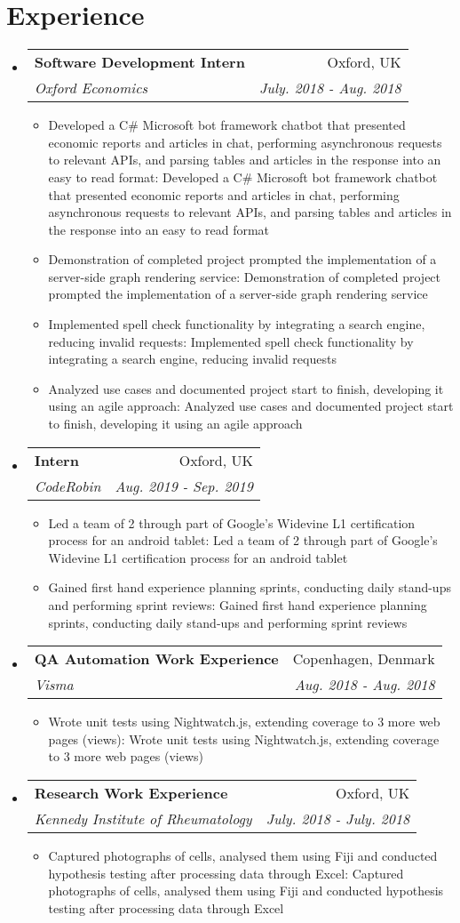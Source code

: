 \documentclass[a4paper,11pt]{article}
\makeatletter
\def \ifempty#1{\def\temp{#1} \ifx\temp\empty }
\newcommand{\resumeItem}[2]{
  \item\small{
  	\ifempty{#1}#2\else\textbf{#1}{: #2 \vspace{-2pt}}\fi
  }
}
\newcommand{\resumeSubheading}[4]{
  \vspace{-1pt}\item
    \begin{tabular*}{0.97\textwidth}{l@{\extracolsep{\fill}}r}
      \textbf{#1} & #2 \\
      \textit{\small#3} & \textit{\small #4} \\
    \end{tabular*}\vspace{-5pt}
}
\newcommand{\resumeSubHeadingListStart}{\begin{itemize}[leftmargin=*]}
\newcommand{\resumeSubHeadingListEnd}{\end{itemize}}
\newcommand{\resumeItemListStart}{\begin{itemize}}
\newcommand{\resumeItemListEnd}{\end{itemize}\vspace{-5pt}}
\makeatother
\begin{document}
\section{Experience}
  \resumeSubHeadingListStart
    \resumeSubheading
      {Software Development Intern}{Oxford, UK}
      {Oxford Economics}{July. 2018 - Aug. 2018}
      \resumeItemListStart
      	\resumeItem{}
          {Developed a C\# Microsoft bot framework chatbot that presented economic 
          reports and articles in chat, performing asynchronous requests to relevant APIs,
          and parsing tables and articles in the response into an easy to read format}
        \resumeItem{}
          {Demonstration of completed project prompted the 
          implementation of a server-side graph rendering service}
        \resumeItem{}  
          {Implemented spell check functionality by integrating a search 
          engine, reducing invalid requests}
        \resumeItem{}
          {Analyzed use cases and documented project start to finish, 
          developing it using an agile approach}
      \resumeItemListEnd
    \resumeSubheading
      {Intern}{Oxford, UK}
      {CodeRobin}{Aug. 2019 - Sep. 2019}
      \resumeItemListStart
      	\resumeItem{}
          {Led a team of 2 through part of Google's Widevine L1 certification process 
          for an android tablet}
        \resumeItem{}
          {Gained first hand experience planning sprints, conducting daily 
          stand-ups and performing sprint reviews}
      \resumeItemListEnd
    \resumeSubheading
      {QA Automation Work Experience}{Copenhagen, Denmark}
      {Visma}{Aug. 2018 - Aug. 2018}
      \resumeItemListStart
      	\resumeItem{}
          {Wrote unit tests using Nightwatch.js, extending coverage to 3 more web pages (views)}
      \resumeItemListEnd
    \resumeSubheading
      {Research Work Experience}{Oxford, UK}
      {Kennedy Institute of Rheumatology}{July. 2018 - July. 2018}
      \resumeItemListStart
      	\resumeItem{}
          {Captured photographs of cells, analysed them using Fiji and 
          conducted hypothesis testing after processing data through Excel}
      \resumeItemListEnd
    
  \resumeSubHeadingListEnd


\end{document}
